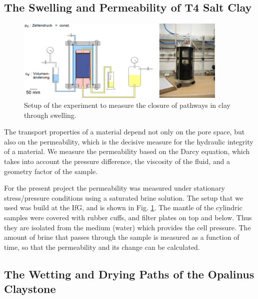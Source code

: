 \subsection{The Swelling and Permeability of T4 Salt Clay}
\label{sec:t4swell}

\begin{figure}[ht]
\centering
\includegraphics[width=0.9\textwidth]{figures/IfG-T4-Perm-aufbau.png}
\caption{Setup of the experiment to measure the closure of pathways in clay through
swelling.}
\label{fig:t4swellsetup}
\end{figure}

The transport properties of a material depend not only on the pore space, but also on the permeability, which is the decisive measure for the hydraulic integrity of a material. We measure the permeability based on the Darcy equation, which takes into account the pressure difference, the viscosity of the fluid, and a geometry factor of the sample. 

For the present project the permeability was measured under stationary stress/pressure conditions using a saturated brine solution. The setup that we used was build at the IfG, and is shown in Fig. \ref{fig:t4swellsetup}. The mantle of the cylindric samples were covered with rubber cuffs, and filter plates on top and below. Thus they are isolated from the medium (water) which provides the cell pressure. The amount of brine that passes through the sample is measured as a function of time, so that the permeability and its change can be calculated. 



\subsection{The Wetting and Drying Paths of the Opalinus Claystone}
\label{sec:Shrinkage_Swelling_Exp}

